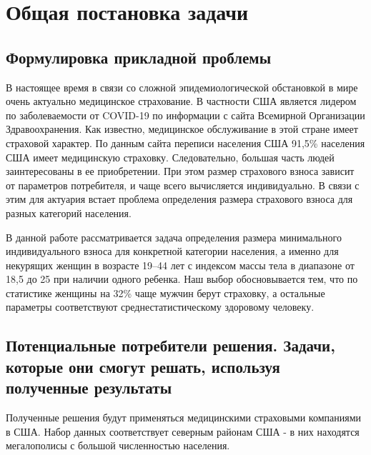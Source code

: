 \documentclass[a4paper,12pt]{article}
\begin{document}

%
\tableofcontents
\pagebreak

\section{Общая постановка задачи}
\subsection{Формулировка прикладной проблемы}
В настоящее время в связи со сложной эпидемиологической обстановкой в мире очень актуально медицинское страхование. В частности США является лидером по заболеваемости от COVID-19 по информации с сайта Всемирной Организации Здравоохранения. Как известно, медицинское обслуживание в этой стране имеет страховой характер. По данным сайта переписи населения США 91,5\% населения США имеет медицинскую страховку. Следовательно, большая часть людей заинтересованы в ее приобретении. При этом размер страхового взноса зависит от параметров потребителя, и чаще всего вычисляется индивидуально. В связи с этим для актуария встает проблема определения размера страхового взноса для разных категорий населения.

В данной работе рассматривается задача определения размера минимального индивидуального взноса для конкретной категории населения, а именно
для некурящих женщин в возрасте 19–44 лет с индексом массы тела в диапазоне от 18,5 до 25 при наличии одного ребенка. Наш выбор обосновывается тем, что по статистике женщины на 32\% чаще мужчин берут страховку, а остальные параметры соответствуют среднестатистическому здоровому человеку.

\subsection{Потенциальные потребители решения. Задачи, которые они смогут решать,	используя полученные результаты}
Полученные решения будут применяться медицинскими страховыми компаниями в США. Набор данных соответствует северным районам США - в них находятся мегалополисы с большой численностью населения.
\end{document}
